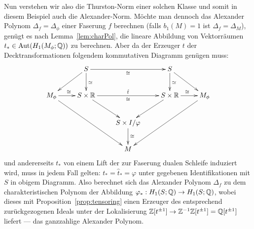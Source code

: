 \begin{bsp}
        Nun verstehen wir also die Thurston-Norm einer solchen Klasse und somit in diesem Beispiel auch die Alexander-Norm.	Möchte man dennoch das Alexander Polynom $\Delta_f=\Delta_\phi$ einer Faserung $f$ berechnen (falls $b_1(M)=1$ ist $\Delta_f=\Delta_M$), genügt es nach Lemma~\ref{lem:charPol}, die lineare Abbildung von Vektorräumen $t_* \in \operatorname{Aut}(H_1(M_\phi;\mathbb{Q}))$ zu berechnen. Aber da der Erzeuger $t$ der Decktransformationen folgendem kommutativen Diagramm genügen muss:
    	\begin{equation*}
     		    	\begin{xy}
    			\xymatrix{
    				&S \ar[d]^{\simeq} \ar[dl] \ar[rr]_\cong && S \ar[d]^{\simeq}\ar[dr]& \\
    				M_\phi \ar[ddrr] \ar[r]^\cong&S \times \RR \ar[rr]^{\hat t}_\cong \ar[dr] && S\times \RR \ar[dl] \ar[r]^\cong&M_\phi \ar[ddll]\\
    				&&S\times I / \varphi \ar[d]^\cong&&\\
                    &&M&&}
    		\end{xy}
    	\end{equation*}
    	und andererseits $t_*$ von einem Lift der zur Faserung dualen Schleife induziert wird, muss in jedem Fall gelten: $t_* = \hat t_* = \varphi$ unter gegebenen Identifikationen mit $S$ in obigem Diagramm. Also berechnet sich das Alexander Polynom $\Delta_f$ zu dem charakteristischen Polynom der Abbildung $\varphi_*:H_1(S;\mathbb{Q})\to H_1(S;\mathbb{Q})$, wobei dieses mit Proposition~\ref{prop:tensoring} einen Erzeuger des entsprechend zurückgezogenen Ideals unter der Lokalisierung $\mathbb{Z}[t^{\pm 1}] \to \mathbb{Z}^{-1}\mathbb{Z}[t^{\pm 1}]=\mathbb{Q}[t^{\pm 1}]$ liefert --- das ganzzahlige Alexander Polynom.%


\end{bsp}
